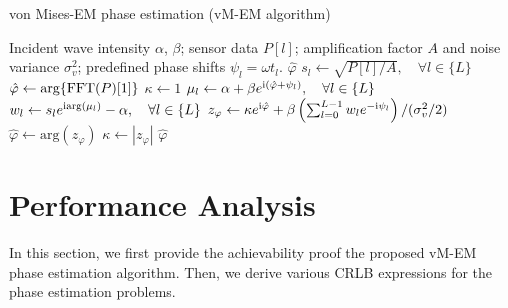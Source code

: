 \documentclass[journal,twocolumn]{IEEEtran}
\theoremstyle{nonumberplain}
\def \arg {\text{arg}}
\def \ri {{\rm i}}
\begin{document}
    \begin{algorithm}[t] 
        \caption{von Mises-EM phase estimation (vM-EM algorithm)} \label{alg:vM-EM}
        \begin{algorithmic}[1]
            \REQUIRE Incident wave intensity $\alpha$, $\beta$; sensor data $P[l]$; amplification factor $A$ and noise variance $\sigma_v^2$; predefined phase shifts $\psi_l=\omega t_l$.
            \ENSURE $\hat{\varphi}$
            \STATE $s_l \leftarrow \sqrt{P[l]/A}, \quad \forall l\in \{L\}$
            \STATE $\hat{\varphi} \leftarrow \arg\{{\rm FFT}(P)[1]\}$
            \STATE $\kappa \leftarrow 1$
                \STATE $\mu_l \leftarrow \alpha + \beta e^{{\ri} (\hat{\varphi}+\psi_l)}, \quad \forall l\in \{L\}$
                \STATE $w_l \leftarrow s_l e^{{\ri} \arg(\mu_l)} - \alpha, \quad \forall l\in \{L\}$
                \STATE $z_\varphi \leftarrow \kappa e^{{\ri} \hat{\varphi}} + \beta \left( \sum_{l=0}^{L-1}{w_l e^{-{\ri} \psi_l}}\right) / (\sigma_v^2/2)$
                \STATE $\hat{\varphi} \leftarrow \arg(z_\varphi)$
                \STATE $\kappa \leftarrow |z_\varphi|$
            \ENDWHILE
            \RETURN $\hat{\varphi}$
        \end{algorithmic}
    \end{algorithm}
    
\section{Performance Analysis}
\label{Performance Analysis}
    In this section, we first provide the achievability proof the proposed vM-EM phase estimation algorithm. Then, we derive various CRLB expressions for the phase estimation problems. 
\end{document}
